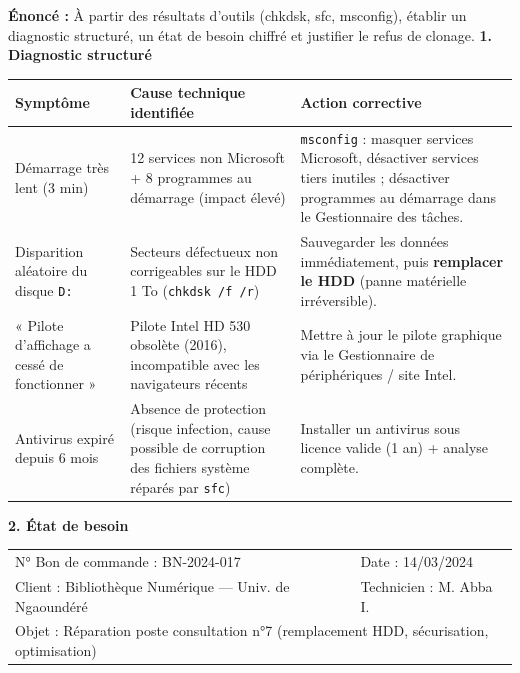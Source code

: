 \documentclass[11pt]{article}
\begin{document}
\begin{corrige}
\textbf{Énoncé :} À partir des résultats d'outils (chkdsk, sfc, msconfig), établir un diagnostic structuré, un état de besoin chiffré et justifier le refus de clonage.
\tcblower
\textbf{1. Diagnostic structuré}

\begin{center}
\begin{tabularx}{\linewidth}{|X|X|X|}\hline
\rowcolor{popblueL}
\textbf{Symptôme} & \textbf{Cause technique identifiée} & \textbf{Action corrective} \\\hline
Démarrage très lent (3 min) & 12 services non Microsoft + 8 programmes au démarrage (impact élevé) & \texttt{msconfig} : masquer services Microsoft, désactiver services tiers inutiles ; désactiver programmes au démarrage dans le Gestionnaire des tâches. \\\hline
Disparition aléatoire du disque \texttt{D:} & Secteurs défectueux non corrigeables sur le HDD 1 To (\texttt{chkdsk /f /r}) & Sauvegarder les données immédiatement, puis \textbf{remplacer le HDD} (panne matérielle irréversible). \\\hline
« Pilote d'affichage a cessé de fonctionner » & Pilote Intel HD 530 obsolète (2016), incompatible avec les navigateurs récents & Mettre à jour le pilote graphique via le Gestionnaire de périphériques / site Intel. \\\hline
Antivirus expiré depuis 6 mois & Absence de protection (risque infection, cause possible de corruption des fichiers système réparés par \texttt{sfc}) & Installer un antivirus sous licence valide (1 an) + analyse complète. \\\hline
\end{tabularx}
\end{center}

\textbf{2. État de besoin}

\begin{center}
\begin{tabular}{|l|l|}
\hline
N° Bon de commande : BN-2024-017 & Date : 14/03/2024 \\
Client : Bibliothèque Numérique — Univ. de Ngaoundéré & Technicien : M. Abba I. \\
\multicolumn{2}{|l|}{Objet : Réparation poste consultation n°7 (remplacement HDD, sécurisation, optimisation)} \\\hline
\end{tabular}
\end{center}


\end{corrige}
\end{document}
